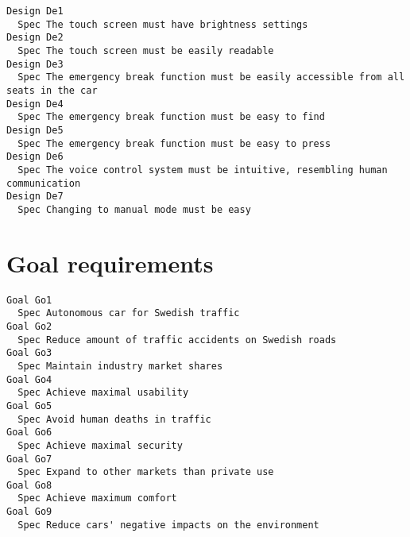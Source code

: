 \begin{lstlisting}
Design De1
  Spec The touch screen must have brightness settings
Design De2
  Spec The touch screen must be easily readable
Design De3
  Spec The emergency break function must be easily accessible from all seats in the car
Design De4
  Spec The emergency break function must be easy to find
Design De5
  Spec The emergency break function must be easy to press
Design De6
  Spec The voice control system must be intuitive, resembling human communication
Design De7
  Spec Changing to manual mode must be easy

\end{lstlisting}


       \section{Goal requirements}


\begin{lstlisting}
Goal Go1
  Spec Autonomous car for Swedish traffic
Goal Go2
  Spec Reduce amount of traffic accidents on Swedish roads
Goal Go3
  Spec Maintain industry market shares
Goal Go4
  Spec Achieve maximal usability
Goal Go5
  Spec Avoid human deaths in traffic
Goal Go6
  Spec Achieve maximal security
Goal Go7
  Spec Expand to other markets than private use
Goal Go8
  Spec Achieve maximum comfort
Goal Go9
  Spec Reduce cars' negative impacts on the environment

\end{lstlisting}
